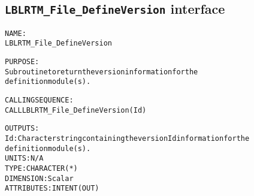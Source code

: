 \subsection{\texttt{LBLRTM\_File\_DefineVersion} interface}
  \label{sec:LBLRTM_File_DefineVersion_interface}
  \begin{alltt}
 
  NAME:
        LBLRTM_File_DefineVersion
 
  PURPOSE:
        Subroutine to return the version information for the
        definition module(s).
 
  CALLING SEQUENCE:
        CALL LBLRTM_File_DefineVersion( Id )
 
  OUTPUTS:
        Id:     Character string containing the version Id information for the
                definition module(s).
                UNITS:      N/A
                TYPE:       CHARACTER(*)
                DIMENSION:  Scalar
                ATTRIBUTES: INTENT(OUT)
 
  \end{alltt}
